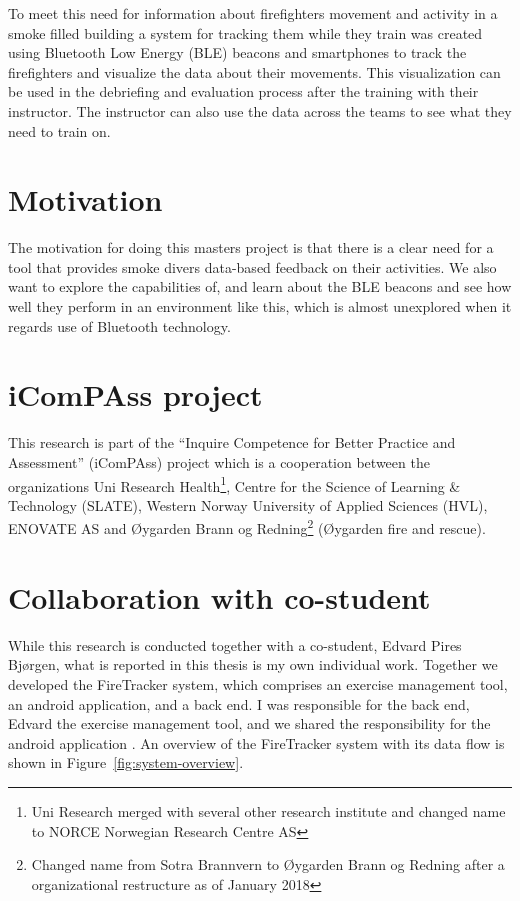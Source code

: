\documentclass[../Main/thesis.tex]{subfiles}
\begin{document}
To meet this need for information about firefighters movement and activity in a smoke filled building a system for tracking them while they train was created using Bluetooth Low Energy (BLE) beacons and smartphones to track the firefighters and visualize the data about their movements. 
This visualization can be used in the debriefing and evaluation process after the training with their instructor.
The instructor can also use the data across the teams to see what they need to train on.

\section{Motivation}
The motivation for doing this masters project is that there is a clear need for a tool that provides smoke divers data-based feedback on their activities.
We also want to explore the capabilities of, and learn about the BLE beacons and see how well they perform in an environment like this, which is almost unexplored when it regards use of Bluetooth technology. 

\section{iComPAss project}
This research is part of the ``Inquire Competence for Better Practice and Assessment'' (iComPAss) project which is a cooperation between the organizations Uni Research Health\footnote{Uni Research merged with several other research institute and changed name to NORCE Norwegian Research Centre AS}, Centre for the Science of Learning \& Technology (SLATE), Western Norway University of Applied Sciences (HVL), ENOVATE AS and Øygarden Brann og Redning\footnote{Changed name from Sotra Brannvern to Øygarden Brann og Redning after a organizational restructure as of January 2018} (Øygarden fire and rescue).
\citep{Netteland2016}

\section{Collaboration with co-student}
While this research is conducted together with a co-student, Edvard Pires Bjørgen, what is reported in this thesis is my own individual work.
Together we developed the FireTracker system, which comprises an exercise management tool, an android application, and a back end.
I was responsible for the back end, Edvard the exercise management tool, and we shared the responsibility for the android application \citep{Bjorgen2018}.
An overview of the FireTracker system with its data flow is shown in Figure~\ref{fig:system-overview}.
\end{document}
